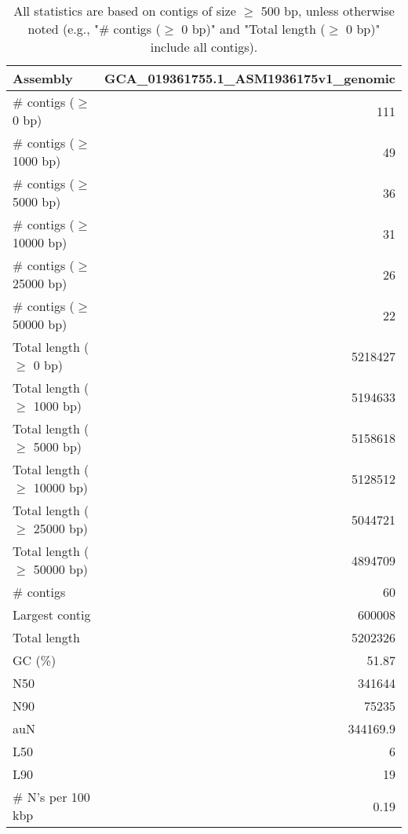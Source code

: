 \documentclass[12pt,a4paper]{article}
\begin{document}
\begin{table}[ht]
\begin{center}
\caption{All statistics are based on contigs of size $\geq$ 500 bp, unless otherwise noted (e.g., "\# contigs ($\geq$ 0 bp)" and "Total length ($\geq$ 0 bp)" include all contigs).}
\begin{tabular}{|l*{1}{|r}|}
\hline
Assembly & GCA\_019361755.1\_ASM1936175v1\_genomic \\ \hline
\# contigs ($\geq$ 0 bp) & 111 \\ \hline
\# contigs ($\geq$ 1000 bp) & 49 \\ \hline
\# contigs ($\geq$ 5000 bp) & 36 \\ \hline
\# contigs ($\geq$ 10000 bp) & 31 \\ \hline
\# contigs ($\geq$ 25000 bp) & 26 \\ \hline
\# contigs ($\geq$ 50000 bp) & 22 \\ \hline
Total length ($\geq$ 0 bp) & 5218427 \\ \hline
Total length ($\geq$ 1000 bp) & 5194633 \\ \hline
Total length ($\geq$ 5000 bp) & 5158618 \\ \hline
Total length ($\geq$ 10000 bp) & 5128512 \\ \hline
Total length ($\geq$ 25000 bp) & 5044721 \\ \hline
Total length ($\geq$ 50000 bp) & 4894709 \\ \hline
\# contigs & 60 \\ \hline
Largest contig & 600008 \\ \hline
Total length & 5202326 \\ \hline
GC (\%) & 51.87 \\ \hline
N50 & 341644 \\ \hline
N90 & 75235 \\ \hline
auN & 344169.9 \\ \hline
L50 & 6 \\ \hline
L90 & 19 \\ \hline
\# N's per 100 kbp & 0.19 \\ \hline
\end{tabular}
\end{center}
\end{table}
\end{document}
